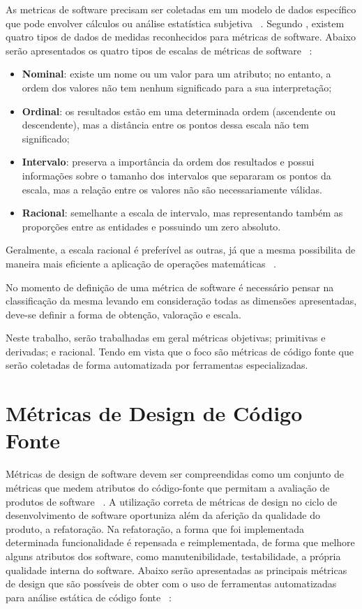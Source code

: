 As metricas de software precisam ser coletadas em um modelo de dados específico que pode envolver cálculos ou análise 
estatística subjetiva ~\cite{meirelles2013}. Segundo \cite{fenton&pfleenger98}, existem quatro tipos de dados de medidas
reconhecidos para métricas de software. Abaixo serão apresentados os quatro tipos de escalas de métricas de software 
~\cite{meirelles2013}:

\begin{itemize}
  \item \textbf{Nominal}: existe um nome ou um valor para um atributo; no entanto, a ordem dos valores não tem nenhum 
    significado para a sua interpretação;
  \item \textbf{Ordinal}: os resultados estão em uma determinada ordem (ascendente ou descendente), mas a distância entre os 
    pontos dessa escala não tem significado;
  \item \textbf{Intervalo}: preserva a importância da ordem dos resultados e possui informações sobre o tamanho dos intervalos
    que separaram os pontos da escala, mas a relação entre os valores não são necessariamente válidas.
  \item \textbf{Racional}: semelhante a escala de intervalo, mas representando também as proporções entre as entidades e
    possuindo um zero absoluto. 
\end{itemize}

Geralmente, a escala racional é preferível as outras, já que a mesma possibilita de maneira mais eficiente a aplicação de 
operações matemáticas ~\cite{meirelles2013}.

No momento de definição de uma métrica de software é necessário pensar na classificação da mesma levando em consideração
todas as dimensões apresentadas, deve-se definir a forma de obtenção, valoração e escala.

Neste trabalho, serão trabalhadas em geral métricas objetivas; primitivas e derivadas; e racional. Tendo em vista que o 
foco são métricas de código fonte que serão coletadas de forma automatizada por ferramentas especializadas.

\section{Métricas de Design de Código Fonte}

Métricas de design de software devem ser compreendidas como um conjunto de métricas que medem atributos do código-fonte que 
permitam a avaliação de produtos de software ~\cite{arthur&carlos2014}. A utilização correta de métricas de design no ciclo
de desenvolvimento de software oportuniza além da aferição da qualidade do produto, a refatoração. Na refatoração, a forma que
foi implementada determinada funcionalidade é repensada e reimplementada, de forma que melhore alguns atributos dos software,
como manutenibilidade, testabilidade, a própria qualidade interna do software. Abaixo serão apresentadas as principais métricas
de design que são possíveis de obter com o uso de ferramentas automatizadas para análise estática de código fonte 
~\cite{arthur&carlos2014,meirelles2013}:


